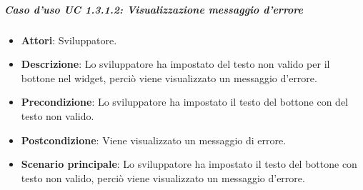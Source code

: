 \subparagraph{Caso d'uso UC 1.3.1.2: Visualizzazione messaggio d'errore}

\FloatBarrier
\begin{itemize}
\item\textbf{Attori}: Sviluppatore.
\item\textbf{Descrizione}: Lo sviluppatore ha impostato del testo non valido per il bottone nel widget, perciò viene visualizzato un messaggio d'errore.
\item\textbf{Precondizione}: Lo sviluppatore ha impostato il testo del bottone con del testo non valido.
\item\textbf{Postcondizione}: Viene visualizzato un messaggio di errore.
\item \textbf{Scenario principale}: Lo sviluppatore ha impostato il testo del bottone con testo non valido, perciò viene visualizzato un messaggio d'errore.
\end{itemize}
